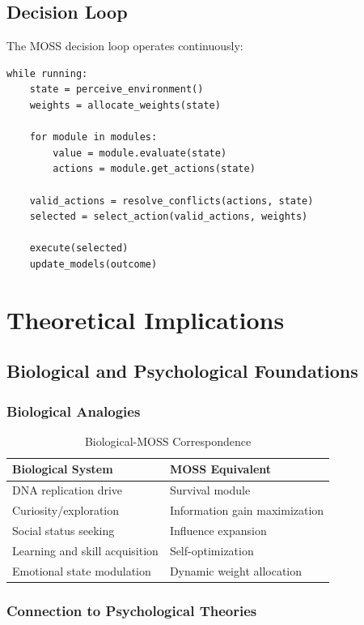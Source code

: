 \documentclass[10pt,a4paper]{article}
\begin{document}
\subsection{Decision Loop}

The MOSS decision loop operates continuously:

\begin{verbatim}
while running:
    state = perceive_environment()
    weights = allocate_weights(state)
    
    for module in modules:
        value = module.evaluate(state)
        actions = module.get_actions(state)
    
    valid_actions = resolve_conflicts(actions, state)
    selected = select_action(valid_actions, weights)
    
    execute(selected)
    update_models(outcome)
\end{verbatim}

\section{Theoretical Implications}

\subsection{Biological and Psychological Foundations}

\subsubsection{Biological Analogies}

\begin{table}[h]
\centering
\caption{Biological-MOSS Correspondence}
\begin{tabular}{@{}ll@{}}
\toprule
\textbf{Biological System} & \textbf{MOSS Equivalent} \\
\midrule
DNA replication drive & Survival module \\
Curiosity/exploration & Information gain maximization \\
Social status seeking & Influence expansion \\
Learning and skill acquisition & Self-optimization \\
Emotional state modulation & Dynamic weight allocation \\
\bottomrule
\end{tabular}
\end{table}

\subsubsection{Connection to Psychological Theories}
\end{document}
